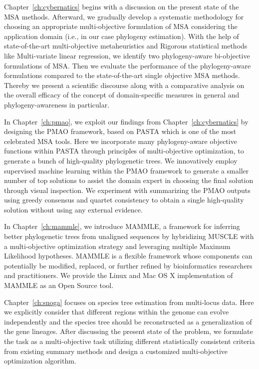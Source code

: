 Chapter~\ref{ch:cybernatics} begins with a discussion on the present state of the MSA methods. Afterward, we gradually develop a systematic methodology for choosing an appropriate multi-objective formulation of MSA considering the application domain (i.e., in our case phylogeny estimation). With the help of state-of-the-art multi-objective metaheuristics and Rigorous statistical methods like Multi-variate linear regression, we identify two phylogeny-aware bi-objective formulations of MSA. Then we evaluate the performance of the phylogeny-aware formulations compared to the state-of-the-art single objective MSA methods. Thereby we present a scientific discourse along with a comparative analysis on the overall efficacy of the concept of domain-specific measures in general and phylogeny-awareness in particular. 

In Chapter~\ref{ch:pmao}, we exploit our findings from Chapter~\ref{ch:cybernatics} by designing the PMAO framework, based on PASTA which is one of the most celebrated MSA tools. Here we incorporate many phylogeny-aware objective functions within PASTA through principles of multi-objective optimization, to generate a bunch of high-quality phylogenetic trees. We innovatively employ supervised machine learning within the PMAO framework to generate a smaller number of top solutions to assist the domain expert in choosing the final solution through visual inspection. We experiment with summarizing the PMAO outputs using greedy consensus and quartet consistency to obtain a single high-quality solution without using any external evidence.


In Chapter~\ref{ch:mammle}, we introduce MAMMLE, a framework for inferring better phylogenetic trees from unaligned sequences by hybridizing MUSCLE with a multi-objective optimization strategy and leveraging multiple Maximum Likelihood hypotheses. MAMMLE is a flexible framework whose components can potentially be modified, replaced, or further refined by bioinformatics researchers and practitioners. We provide the Linux and Mac OS X implementation of MAMMLE as an Open Source tool.


Chapter~\ref{ch:snoga} focuses on species tree estimation from multi-locus data. Here we explicitly consider that different regions within the genome can evolve independently and the species tree should be reconstructed as a generalization of the gene lineages. After discussing the present state of the problem, we formulate the task as a multi-objective task utilizing different statistically consistent criteria from existing summary methods and design a customized multi-objective optimization algorithm.


